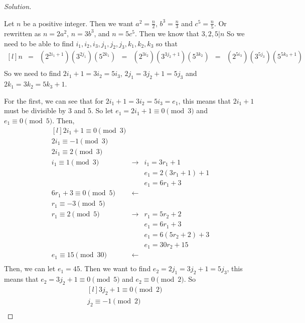 \documentclass[11pt]{article}
\newenvironment{solution}
  {\renewcommand\qedsymbol{$~$}\begin{proof}[Solution]$ $\par\nobreak\ignorespaces}
  {\end{proof}}
\begin{document}
\begin{solution}
    Let $n$ be a positive integer. Then we want $a^2=\frac{n}{2}$, $b^3=\frac{n}{3}$ and $c^5 = \frac{n}{5}$. Or rewritten as $n=2a^2$, $n=3b^3$, and $n=5c^5$. Then we know that $3,2,5|n$ So we need to be able to find $i_1,i_2,i_3, j_1,j_2,j_3, k_1,k_2,k_3$ so that
    \[
        \begin{matrix*}[l]
            n &=& (2^{2i_1+1})(3^{2j_1})(5^{2k_1})  &=& (2^{3i_2})(3^{3j_2+1})(5^{3k_2}) &=& (2^{5i_3})(3^{5j_3})(5^{5k_3+1}) \\
        \end{matrix*}
    \]
    So we need to find $2i_1 + 1 = 3i_2 = 5i_3$, $2j_1 = 3j_2+1 = 5j_3$ and $2k_1 = 3k_2 = 5k_3+1$.

    For the first, we can see that for $2i_1 + 1 = 3i_2 = 5i_3=e_1$, this means that $2i_1+1$ must be divisible by 3 and 5. So let $e_1=2i_1+1\equiv 0 \pmod{3}$ and $e_1 \equiv 0 \pmod{5}$. Then,
    \[
        \begin{matrix*}[l]
            2i_1 + 1 \equiv 0 \pmod{3} && \\
            2i_1 \equiv -1 \pmod{3} && \\
            2i_1  \equiv 2 \pmod{3} && \\
            i_1  \equiv 1 \pmod{3} &\rightarrow& i_1=3r_1 + 1\\
            && e_1 = 2(3r_1+1) + 1 \\
            && e_1 = 6r_1 + 3 \\
            6r_1 + 3 \equiv 0 \pmod{5} &\leftarrow & \\
            r_1 \equiv -3 \pmod{5} && \\
            r_1 \equiv 2 \pmod{5} &\rightarrow& r_1= 5r_2 + 2 \\
            && e_1 = 6r_1 + 3 \\
            && e_1 = 6(5r_2+2) +3 \\
            && e_1 = 30r_2 + 15 \\
            e_1 \equiv 15 \pmod{30} &\leftarrow&\\
        \end{matrix*}
    \]
    Then, we can let $e_1=45$. Then we want to find $e_2=2j_1 = 3j_2+1 = 5j_3$, this means that $e_2 = 3j_2 + 1 \equiv 0 \pmod{5}$ and $e_2\equiv 0 \pmod{2}$. So
    \[
        \begin{matrix*}[l]
            3j_2 + 1 \equiv 0 \pmod{2} && \\
            j_2 \equiv -1 \pmod{2} && \\

\end{matrix*}\]
\end{solution}
\end{document}
